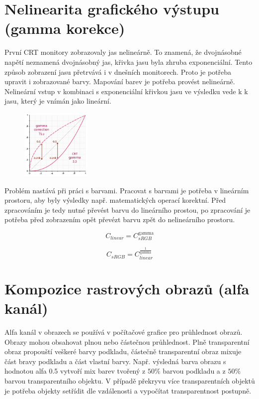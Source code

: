 \section{Nelinearita grafického výstupu (gamma korekce)}
První CRT monitory zobrazovaly jas nelineárně. To znamená, že dvojnásobné napětí neznamená dvojnásobný jas, křivka jasu byla zhruba exponenciální. Tento způsob zobrazení jasu přetrvává i v dnešních monitorech. Proto je potřeba upravit i zobrazované barvy. Mapování barev je potřeba provést nelineárně. Nelineární vstup v kombinaci s exponenciální křivkou jasu ve výsledku vede k k jasu, který je vnímán jako lineární. 
\begin{figure}[H]
    \centering
    \includegraphics[width=0.3\textwidth]{assets/1_gamma_correction_gamma_curves.png}
\end{figure}
Problém nastává při práci s barvami. Pracovat s barvami je potřeba v lineárním prostoru, aby byly výsledky např. matematických operací korektní. Před zpracováním je tedy nutné převést barvu do lineárního prostou, po zpracování je potřeba před zobrazením opět převézt barvu zpět do nelineárního prostoru.

\begin{equation}
    C_{linear} = C_{sRGB}^{\text{gamma}}
\end{equation}

\begin{equation}
    C_{sRGB} = C_{linear}^{\frac{1}{\text{gamma}}}
\end{equation}

\section{Kompozice rastrových obrazů (alfa kanál)}
Alfa kanál v obrazech se používá v počítačové grafice pro průhlednost obrazů. Obrazy mohou obsahovat plnou nebo částečnou průhlednost. Plně transparentní obraz propouští veškeré barvy podkladu, částečně transparentní obraz mixuje část bravy podkladu a část vlastní barvy. Např. výsledná barva obrazu s hodnotou alfa 0.5 vytvoří mix barev tvořený z $50\%$ barvou podkladu a z $50\%$ barvou transparentního objektu. V případě překryvu více transparentních objektů je potřeba objekty setřídit dle vzdálenosti a vypočítat transparentnost postupně.   

